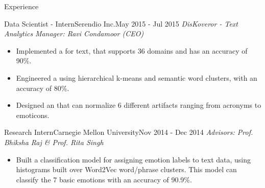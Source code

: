 \documentclass[]{mcdowellcv}
\begin{document}
\begin{cvsection}{Experience}
		\begin{cvsubsection}{Data Scientist - Intern}{Serendio Inc.}{May 2015 - Jul 2015}
		    \textit{DisKoveror - Text Analytics} \hfill \textit{Manager: Ravi Condamoor (CEO)}
			\begin{itemize}
            	\item Implemented a \href{https://github.com/tpsatish95/Universal-MultiDomain-Sentiment-Classifier}{} for text, that supports 36 domains and has an accuracy of 90\%.
                \item Engineered a \href{https://github.com/tpsatish95/Topic-Modeling-Social-Network-Text-Data}{} using hierarchical k-means and semantic word clusters, with an accuracy of 80\%.
                \item Designed an \href{https://github.com/tpsatish95/SocialTextFilter}{} that can normalize 6 different artifacts ranging from acronyms to emoticons.
			\end{itemize}
		\end{cvsubsection}

		\begin{cvsubsection}{Research Intern}{Carnegie Mellon University}{Nov 2014 - Dec 2014}
		    \textit{\href{https://github.com/tpsatish95/emotion-detection-from-text}{\color{blue!70}{Text-based Emotion Recognition System}}} \hfill \textit{Advisors: Prof. Bhiksha Raj \& Prof. Rita Singh}
			\begin{itemize}
				\item Built a classification model for assigning emotion labels to text data, using histograms built over Word2Vec word/phrase clusters. This model can classify the 7 basic emotions with an accuracy of 90.9\%.
			\end{itemize}
		\end{cvsubsection}
	\end{cvsection}
\end{document}
